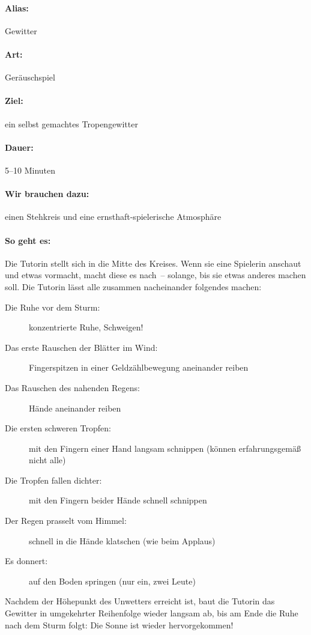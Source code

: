 \paragraph{Alias:} Gewitter
\paragraph{Art:} Geräuschspiel
\paragraph{Ziel:} ein selbst gemachtes Tropengewitter
\paragraph{Dauer:} 5--10 Minuten
\paragraph{Wir brauchen dazu:} einen Stehkreis und eine ernsthaft-spielerische Atmosphäre
\paragraph{So geht es:} Die Tutorin stellt sich in die Mitte des Kreises. Wenn sie eine Spielerin anschaut und etwas vormacht, macht diese es nach~-- solange, bis sie etwas anderes machen soll. Die Tutorin lässt alle zusammen nacheinander folgendes machen:
	\begin{description}
		\item[Die Ruhe vor dem Sturm:] konzentrierte Ruhe, Schweigen!
		\item[Das erste Rauschen der Blätter im Wind:] Fingerspitzen in einer Geldzählbewegung aneinander reiben
		\item[Das Rauschen des nahenden Regens:] Hände aneinander reiben
		\item[Die ersten schweren Tropfen:] mit den Fingern einer Hand langsam schnippen (können erfahrungsgemäß nicht alle)
		\item[Die Tropfen fallen dichter:] mit den Fingern beider Hände schnell schnippen
		\item[Der Regen prasselt vom Himmel:] schnell in die Hände klatschen (wie beim Applaus)
		\item[Es donnert:] auf den Boden springen (nur ein, zwei Leute)
	\end{description}
Nachdem der Höhepunkt des Unwetters erreicht ist, baut die Tutorin das Gewitter in umgekehrter Reihenfolge wieder langsam ab, bis am Ende die Ruhe nach dem Sturm folgt: Die Sonne ist wieder hervorgekommen!
